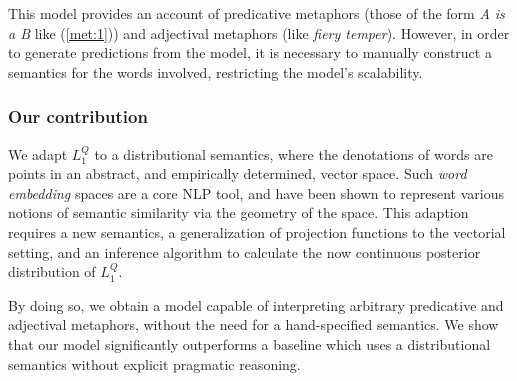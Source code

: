 \documentclass[OpenMind]{stjour}
\newcommand{\Listener}{L}
\newcommand{\QLONE}{\Listener_{{1}}^{{Q}}}
\begin{document}
	This model provides an account of predicative metaphors (those of the form \emph{A is a B} like (\ref{met:1})) and adjectival metaphors (like \emph{fiery temper}). However, in order to generate predictions from the model, it is necessary to manually construct a semantics for the words involved, restricting the model's scalability.


	




	\subsubsection{Our contribution} We adapt $\QLONE$ to a distributional semantics, where the denotations of words are points in an abstract, and empirically determined, vector space. Such \emph{word embedding} spaces are a core NLP tool, and have been shown to represent various notions of semantic similarity via the geometry of the space.
	This adaption requires a new semantics, a generalization of projection functions to the vectorial setting, and an inference algorithm to calculate the now continuous posterior distribution of $\QLONE$.
		


	By doing so, we obtain a model capable of interpreting arbitrary predicative and adjectival metaphors, without the need for a hand-specified semantics. We show that our model significantly outperforms a baseline which uses a distributional semantics without explicit pragmatic reasoning.
\end{document}
